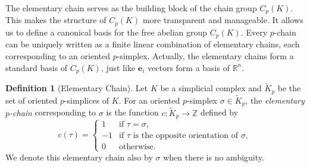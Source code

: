 \documentclass[12pt,oneside,reqno]{amsart}
\theoremstyle{plain}
\theoremstyle{definition}
\newtheorem{definition}[theorem]{Definition}
\theoremstyle{remark}
\newcommand{\0}{{\textbf{0}}}
\begin{document}
The elementary chain serves as the building block of the chain group $C_p(K)$. This makes the structure of $C_p(K)$ more transparent and manageable. It allows us to define a canonical basis for the free abelian group $C_p(K)$. Every $p$-chain can be uniquely written as a finite linear combination of elementary chains, each corresponding to an oriented $p$-simplex. Actually, the elementary chains form a standard basis of $C_p(K)$, just like $\mathbf{e}_i$ vectors form a basis of $\mathbb{R}^n$.

\begin{definition}[Elementary Chain]\label{def:elementary-chain}
Let $K$ be a simplicial complex and $\widetilde{K}_p$ be the set of oriented $p$-simplices of $K$. For an oriented $p$-simplex $\sigma \in \widetilde{K}_p$, the \emph{elementary $p$-chain} corresponding to $\sigma$ is the function $c : \widetilde{K}_p \to \mathbb{Z}$ defined by
\[
c(\tau) =
\begin{cases}
1 & \text{if } \tau = \sigma, \\
-1 & \text{if } \tau \text{ is the opposite orientation of } \sigma, \\
0 & \text{otherwise}.
\end{cases}
\]
We denote this elementary chain also by $\sigma$ when there is no ambiguity.
\end{definition}
\end{document}
